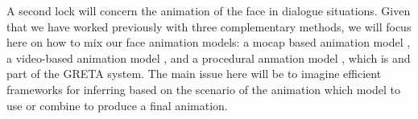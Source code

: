 

A second lock will concern the animation of the face in dialogue situations. Given that we have worked previously with three complementary methods, we will focus here on how to mix our face animation models: a mocap based animation model \cite{YuThesis}, a video-based animation model \cite{INRIA}, and a procedural anmation model \cite{}, which is and part of the GRETA system. The main issue here will be to imagine efficient frameworks for inferring based on the scenario of the animation which model to use or combine to produce a final animation.



